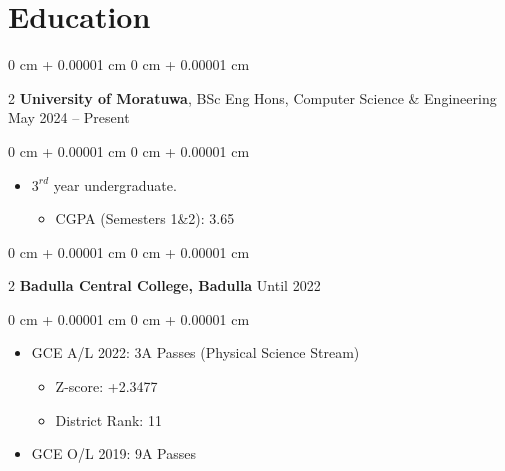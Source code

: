 \documentclass[10pt, letterpaper]{article}
\newenvironment{highlights}{ \begin{itemize}[ topsep=0.10 cm, parsep=0.10 cm, partopsep=0pt,
itemsep=0pt, leftmargin=0 cm + 10pt ] }{ \end{itemize} } %
\newenvironment{onecolentry}{ \begin{adjustwidth}{ 0 cm + 0.00001 cm }{ 0 cm + 0.00001 cm }
}{ \end{adjustwidth} } %
\newenvironment{twocolentry}[2][]{ \onecolentry \def\secondColumn{#2} \setcolumnwidth{\fill, 4.5 cm}
\begin{paracol}{2} }{ \switchcolumn \raggedleft \secondColumn \end{paracol}
\endonecolentry } %
\begin{document}
  \section{Education}
  \begin{twocolentry}
    {May 2024 -- Present} \textbf{University of Moratuwa}, BSc Eng Hons,
    Computer Science \& Engineering
  \end{twocolentry}
  \vspace{0.10 cm}
  \begin{onecolentry}
    \begin{highlights}
      \item $3^{rd}$ year undergraduate.
      \begin{itemize}
        \item CGPA (Semesters 1\&2): 3.65
      \end{itemize}
    \end{highlights}
  \end{onecolentry}
  \vspace{0.2 cm}
  \begin{twocolentry}
    {Until 2022} \textbf{Badulla Central College, Badulla}
  \end{twocolentry}
  \vspace{0.10 cm}
  \begin{onecolentry}
    \begin{highlights}
      \item GCE A/L 2022: 3A Passes (Physical Science Stream)
      \begin{itemize}
        \item Z-score: +2.3477
      \end{itemize}
      \begin{itemize}
        \item District Rank: 11
      \end{itemize}
      \item GCE O/L 2019: 9A Passes
    \end{highlights}
  \end{onecolentry}
\end{document}
